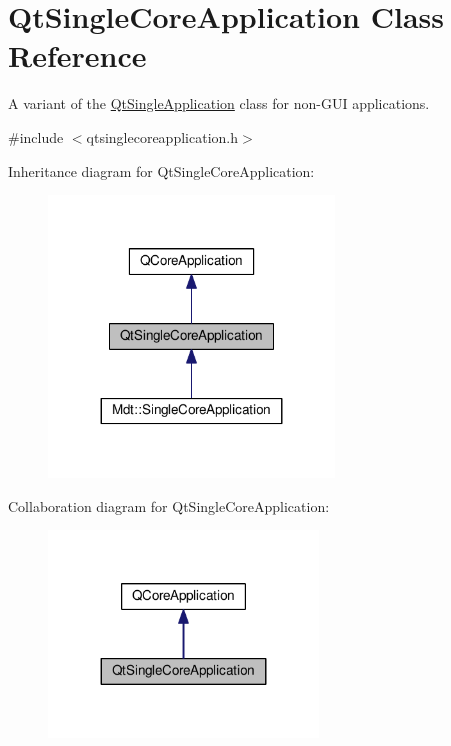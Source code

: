 \hypertarget{class_qt_single_core_application}{}\section{Qt\+Single\+Core\+Application Class Reference}
\label{class_qt_single_core_application}


A variant of the \hyperlink{class_qt_single_application}{Qt\+Single\+Application} class for non-\/\+G\+UI applications.  




{\ttfamily \#include $<$qtsinglecoreapplication.\+h$>$}



Inheritance diagram for Qt\+Single\+Core\+Application\+:\nopagebreak
\begin{figure}[H]
\begin{center}
\leavevmode
\includegraphics[width=215pt]{class_qt_single_core_application__inherit__graph}
\end{center}
\end{figure}


Collaboration diagram for Qt\+Single\+Core\+Application\+:\nopagebreak
\begin{figure}[H]
\begin{center}
\leavevmode
\includegraphics[width=203pt]{class_qt_single_core_application__coll__graph}
\end{center}
\end{figure}

